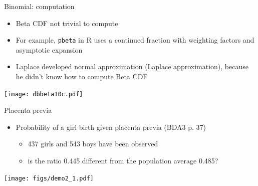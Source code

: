 \documentclass[english,t]{beamer}
\begin{document}
\begin{frame}{Binomial: computation}

  \begin{itemize}
  \item Beta CDF not trivial to compute
  \item For example, {\tt pbeta} in R uses a continued fraction with
    weighting factors and asymptotic expansion
  \item Laplace developed normal approximation (Laplace
    approximation), because he didn't know how to compute Beta CDF
  \end{itemize}

  \begin{center}
    {\texttt{[image: dbbeta10c.pdf]}}
  \end{center}
  
\end{frame}

\begin{frame}{Placenta previa}

  \begin{itemize}
  \item Probability of a girl birth given placenta previa (BDA3 p. 37)
    \begin{itemize}
    \item 437 girls and 543 boys have been observed
    \item is the ratio 0.445 different from the population average 0.485?
    \end{itemize}
  \end{itemize}
  \pause
  \texttt{[image: figs/demo2\_1.pdf]}
\end{frame}
\end{document}
